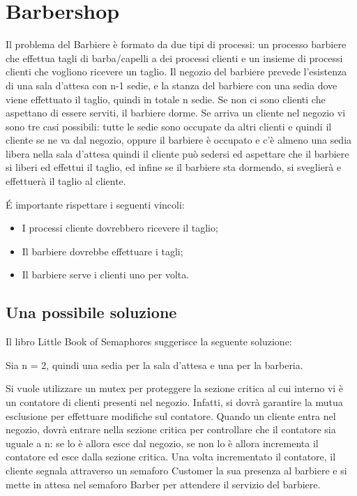 \section{Barbershop}
Il problema del Barbiere è formato da due tipi di processi: un processo barbiere che effettua tagli di barba/capelli a dei processi clienti e un insieme di processi clienti che vogliono ricevere un taglio. Il negozio del barbiere prevede l'esistenza di una sala d'attesa con n-1 sedie, e la stanza del barbiere con una sedia dove viene effettuato il taglio, quindi in totale n sedie. Se non ci sono clienti che aspettano di essere serviti, il barbiere dorme. Se arriva un cliente nel negozio vi sono tre casi possibili: tutte le sedie sono occupate da altri clienti e quindi il cliente se ne va dal negozio, oppure il barbiere è occupato e c'è almeno una sedia libera nella sala d'attesa quindi il cliente può sedersi ed aspettare che il barbiere si liberi ed effettui il taglio, ed infine se il barbiere sta dormendo, si sveglierà e effettuerà il taglio al cliente.

É importante rispettare i seguenti vincoli:

\begin{itemize}
	\item I processi cliente dovrebbero ricevere il taglio;
	\item Il barbiere dovrebbe effettuare i tagli;
	\item Il barbiere serve i clienti uno per volta.
	
\end{itemize}

\subsection{Una possibile soluzione}
Il libro Little Book of Semaphores suggerisce la seguente soluzione: 

Sia n = 2, quindi una sedia per la sala d'attesa e una per la barberia. 

Si vuole utilizzare un \textsf{mutex} per proteggere la sezione critica al cui interno vi è un contatore di clienti presenti nel negozio. Infatti, si dovrà garantire la mutua esclusione per effettuare modifiche sul contatore. Quando un cliente entra nel negozio, dovrà entrare nella sezione critica per controllare che il contatore sia uguale a n: se lo è allora esce dal negozio, se non lo è allora incrementa il contatore ed esce dalla sezione critica. Una volta incrementato il contatore, il cliente segnala attraverso un semaforo \textsf{Customer} la sua presenza al barbiere e si mette in attesa nel semaforo \textsf{Barber} per attendere il servizio del barbiere.

